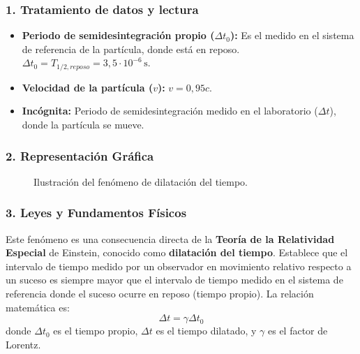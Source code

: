 \subsubsection*{1. Tratamiento de datos y lectura}
\begin{itemize}
    \item \textbf{Periodo de semidesintegración propio ($\Delta t_0$):} Es el medido en el sistema de referencia de la partícula, donde está en reposo. $\Delta t_0 = T_{1/2, reposo} = 3,5 \cdot 10^{-6} \, \text{s}$.
    \item \textbf{Velocidad de la partícula ($v$):} $v = 0,95c$.
    \item \textbf{Incógnita:} Periodo de semidesintegración medido en el laboratorio ($\Delta t$), donde la partícula se mueve.
\end{itemize}

\subsubsection*{2. Representación Gráfica}
\begin{figure}[H]
    \centering
    \caption{Ilustración del fenómeno de dilatación del tiempo.}
\end{figure}

\subsubsection*{3. Leyes y Fundamentos Físicos}
Este fenómeno es una consecuencia directa de la \textbf{Teoría de la Relatividad Especial} de Einstein, conocido como \textbf{dilatación del tiempo}.
Establece que el intervalo de tiempo medido por un observador en movimiento relativo respecto a un suceso es siempre mayor que el intervalo de tiempo medido en el sistema de referencia donde el suceso ocurre en reposo (tiempo propio).
La relación matemática es:
$$ \Delta t = \gamma \Delta t_0 $$
donde $\Delta t_0$ es el tiempo propio, $\Delta t$ es el tiempo dilatado, y $\gamma$ es el factor de Lorentz.

